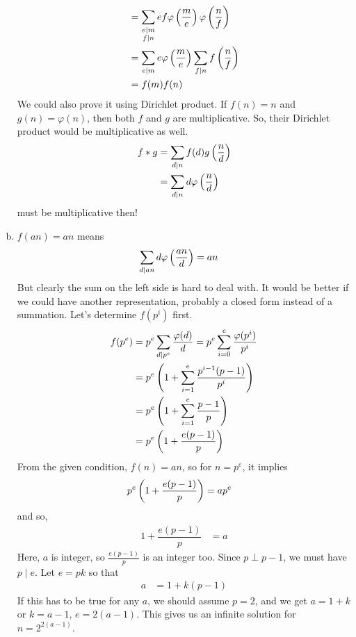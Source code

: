 \begin{solution}
\begin{enumerate}[(a)]
\begin{align*}
					  & = \sum_{\substack{e\mid m\\f\mid n}}ef\varphi\left(\dfrac{m}{e}\right)\varphi\left(\dfrac{n}{f}\right)\\
					  & = \sum_{e\mid m}e\varphi\left(\dfrac{m}{e}\right)\sum_{f\mid n}f\left(\dfrac{n}{f}\right)\\
					  & = f(m)f(n)
					\end{align*}
				We could also prove it using Dirichlet product. If $f(n)=n$ and $g(n)=\varphi(n)$, then both $f$ and $g$ are multiplicative. So, their Dirichlet product would be multiplicative as well.
					\begin{align*}
						f\ast g & = \sum_{d\mid n}f(d)g\left(\dfrac{n}{d}\right)\\
								& = \sum_{d\mid n}d\varphi\left(\dfrac{n}{d}\right)
					\end{align*}
				must be multiplicative then!
			\item $f(an)=an$ means
					\begin{align*}
						\sum_{d\mid an}d\varphi\left(\dfrac{an}{d}\right) & = an
					\end{align*}
				But clearly the sum on the left side is hard to deal with. It would be better if we could have another representation, probably a closed form instead of a summation. Let's determine $f(p^i)$ first.
					\begin{align*}
						f(p^e)  & = p^e\sum_{d\mid p^e}\dfrac{\varphi(d)}{d} = p^e\sum_{i=0}^{e}\dfrac{\varphi(p^i)}{p^i}\\
								& = p^e\left(1+\sum_{i=1}^{e}\dfrac{p^{i-1}(p-1)}{p^i}\right)\\
								& = p^e\left(1+\sum_{i=1}^{e}\dfrac{p-1}{p}\right)\\
								& = p^e\left(1+\dfrac{e(p-1)}{p}\right)
					\end{align*}
				From the given condition, $f(n) = an$, so for $n=p^e$, it implies
					\begin{align*}
						p^{e}\left(1+\dfrac{e(p-1)}{p}\right) & = ap^e
					\end{align*}
				and so,
					\begin{align*}
						1+\dfrac{e(p-1)}{p} & = a
					\end{align*}
				Here, $a$ is integer, so $\frac{e(p-1)}{p}$ is an integer too. Since $p\perp p-1$, we must have $p\mid e$. Let $e=pk$ so that
					\begin{align*}
						a & = 1+k(p-1)
					\end{align*}
				If this has to be true for any $a$, we should assume $p=2$, and we get $a=1+k$ or $k=a-1$, $e=2(a-1)$. This gives us an infinite solution for $n=2^{2(a-1)}$.
		\end{enumerate}
\end{solution}

